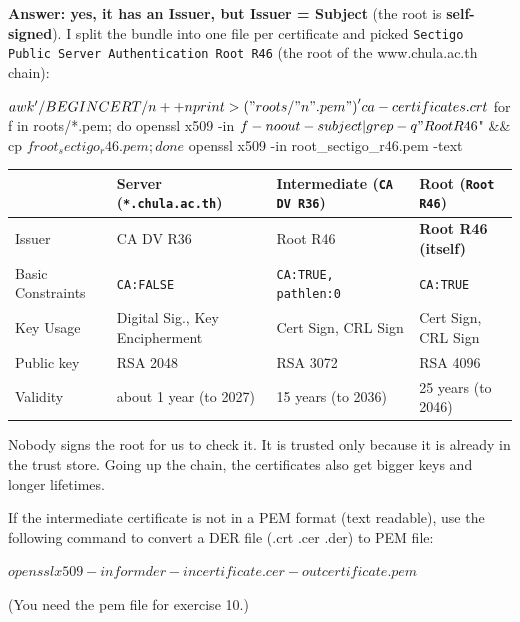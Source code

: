 \documentclass[a4paper, 10pt]{article}
\begin{document}
\begin{solution}
	\noindent \textbf{Answer: yes, it has an Issuer, but Issuer = Subject} (the root is \textbf{self-signed}).
	I split the bundle into one file per certificate and picked \texttt{Sectigo Public Server Authentication Root R46}
	(the root of the www.chula.ac.th chain):

	\myspace

	\begin{codingbox*}[numbers=none, xleftmargin=0pt, belowskip=6pt, basicstyle=\ttfamily\footnotesize\color{editortext}]
$ awk '/BEGIN CERT/{n++} n{print > ("roots/" n ".pem")}' ca-certificates.crt
$ for f in roots/*.pem; do openssl x509 -in $f -noout -subject | grep -q "Root R46$" && cp $f root_sectigo_r46.pem; done
$ openssl x509 -in root_sectigo_r46.pem -text
\end{codingbox*}

	\begin{center}
		\footnotesize
		\begin{tabular}{llll}
			\toprule
			& Server (\texttt{*.chula.ac.th}) & Intermediate (\texttt{CA DV R36}) & Root (\texttt{Root R46}) \\
			\midrule
			Issuer & CA DV R36 & Root R46 & \textbf{Root R46 (itself)} \\
			Basic Constraints & \texttt{CA:FALSE} & \texttt{CA:TRUE, pathlen:0} & \texttt{CA:TRUE} \\
			Key Usage & Digital Sig., Key Encipherment & Cert Sign, CRL Sign & Cert Sign, CRL Sign \\
			Public key & RSA 2048 & RSA 3072 & RSA 4096 \\
			Validity & about 1 year (to 2027) & 15 years (to 2036) & 25 years (to 2046) \\
			\bottomrule
		\end{tabular}
	\end{center}

	Nobody signs the root for us to check it.
	It is trusted only because it is already in the trust store.
	Going up the chain, the certificates also get bigger keys and longer lifetimes.
\end{solution}

\begin{problem}
	If the intermediate certificate is not in a PEM format (text readable), use the following
	command to convert a DER file (.crt .cer .der) to PEM file:
	\begin{codingbox}[language=bash]
$ openssl x509 -inform der -in certificate.cer -out certificate.pem
$
\end{codingbox}
	\noindent (You need the pem file for exercise 10.)
\end{problem}
\end{document}

